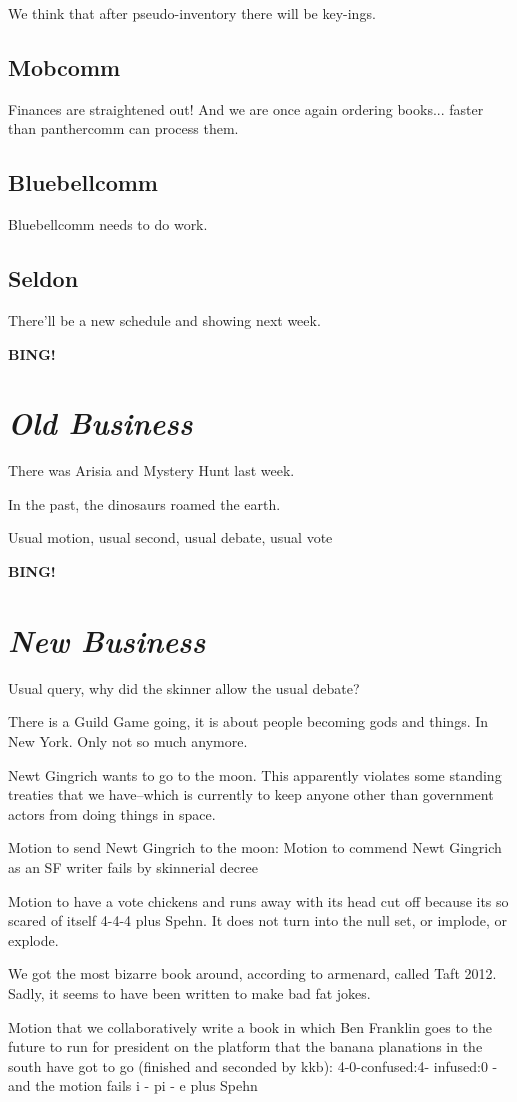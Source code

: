 \documentclass[10pt]{article}
\newcommand{\bing}{{\bf BING!} }
\newcommand{\goto}[1]{\bing \vskip 12pt \section*{{\em{#1}}}}
\begin{document}
We think that after pseudo-inventory there will be key-ings.

\subsection*{Mobcomm}
Finances are straightened out! And we are once again ordering books... faster than panthercomm can process them.

\subsection*{Bluebellcomm}

Bluebellcomm needs to do work.

\subsection*{Seldon}

There'll be a new schedule and showing next week.

\goto{Old Business}

There was Arisia and Mystery Hunt last week.

In the past, the dinosaurs roamed the earth.

Usual motion, usual second, usual debate, usual vote

\goto{New Business}

Usual query, why did the skinner allow the usual debate?

There is a Guild Game going, it is about people becoming gods and things. In New York. Only not so much anymore.

Newt Gingrich wants to go to the moon. This apparently violates some standing treaties that we have--which is currently to keep anyone other than government actors from doing things in space.

Motion to send Newt Gingrich to the moon:
Motion to commend Newt Gingrich as an SF writer fails by skinnerial decree

Motion to have a vote chickens and runs away with its head cut off because its so scared of itself 4-4-4 plus Spehn. It does not turn into the null set, or implode, or explode.

We got the most bizarre book around, according to armenard, called Taft 2012. Sadly, it seems to have been written to make bad fat jokes.

Motion that we collaboratively write a book in which Ben Franklin goes to the future to run for president on the platform that the banana planations in the south have got to go (finished and seconded by kkb):
4-0-confused:4- infused:0 - and the motion fails i - pi - e plus Spehn
\end{document}
